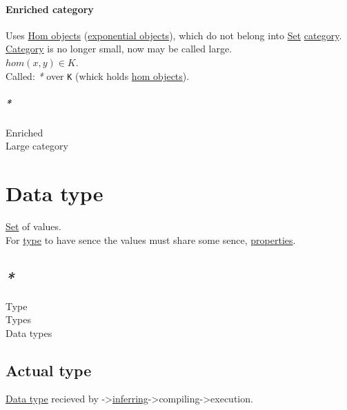 \documentclass[a4paper,14pt,oneside]{book}
\begin{document}
{\subsubsection{\label{orgc9fbb54}Enriched category}
\label{sec:org0ae4878}
Uses \hyperref[org2c6ce40]{Hom objects} (\hyperref[orgb857e31]{exponential objects}), which do not belong into \hyperref[org0726f94]{Set} \hyperref[orgf2b19ad]{category}.\\
\hyperref[orgf2b19ad]{Category} is no longer small, now may be called large.\\

\(hom(x,y) \in K\).\\

Called: \emph{*} over \texttt{K} (whick holds \hyperref[org2c6ce40]{hom objects}).\\

\paragraph{\emph{*}}
\label{sec:org3f756bc}
\label{org6b33e0f}Enriched\\
\label{org58210e9}Large category\\

\chapter{\label{org3de168a}Data type}
\label{sec:org2e6ae8f}
\hyperref[org0726f94]{Set} of values.\\
For \hyperref[orga9ca243]{type} to have sence the values must share some sence, \hyperref[org5fc06ca]{properties}.\\

\section{\emph{*}}
\label{sec:org11ec4b4}

\label{orga9ca243}Type\\
\label{org51532d9}Types\\
\label{org6c691ac}Data types\\

\section{\label{orgfac2e12}Actual type}
\label{sec:orgc1889c2}
\hyperref[org3de168a]{Data type} recieved by ->\hyperref[orgf3612cf]{inferring}->compiling->execution.\\

}
\end{document}
